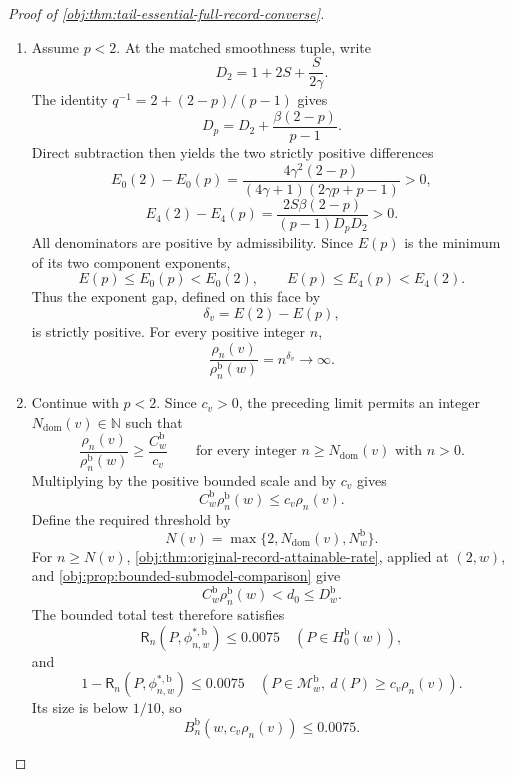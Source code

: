 \begin{proof}[Proof of \cref{obj:thm:tail-essential-full-record-converse}]
\begin{enumerate}
When \(F(p)\ge1\), the paired-tent formula applies throughout:
\[
N=2\left\lceil n^{2q/(2\gamma+q)}\right\rceil
\ge n^{2q/(2\gamma+q)}\longrightarrow\infty,
\qquad
L_{n,v}=N^{\gamma/(p-1)}.
\]
Here \(2q/(2\gamma+q)>0\) and \(\gamma/(p-1)>0\), proving the same
divergence.

\item
Assume \(p<2\). At the matched smoothness tuple, write
\[
D_2=1+2S+\frac{S}{2\gamma}.
\]
The identity \(q^{-1}=2+(2-p)/(p-1)\) gives
\[
D_p=D_2+\frac{\beta(2-p)}{p-1}.
\]
Direct subtraction then yields the two strictly positive differences
\[
E_0(2)-E_0(p)
=
\frac{4\gamma^2(2-p)}
     {(4\gamma+1)(2\gamma p+p-1)}>0,
\]
\[
E_4(2)-E_4(p)
=
\frac{2S\beta(2-p)}
     {(p-1)D_pD_2}>0.
\]
All denominators are positive by admissibility. Since \(E(p)\) is the
minimum of its two component exponents,
\[
E(p)\le E_0(p)<E_0(2),\qquad
E(p)\le E_4(p)<E_4(2).
\]
Thus the exponent gap, defined on this face by
\[
\delta_v=E(2)-E(p),
\]
is strictly positive. For every positive integer \(n\),
\[
\frac{\rho_n(v)}{\rho_n^{\mathrm b}(w)}
=n^{\delta_v}\longrightarrow\infty.
\]

\item
Continue with \(p<2\). Since \(c_v>0\), the preceding limit permits an
integer \(N_{\mathrm{dom}}(v)\in\mathbb N\) such that
\[
\frac{\rho_n(v)}{\rho_n^{\mathrm b}(w)}
\ge\frac{C_w^{\mathrm b}}{c_v}
\qquad
\text{for every integer }n\ge N_{\mathrm{dom}}(v)\text{ with }n>0.
\]
Multiplying by the positive bounded scale and by \(c_v\) gives
\[
C_w^{\mathrm b}\rho_n^{\mathrm b}(w)\le c_v\rho_n(v).
\]
Define the required threshold by
\[
N(v)=\max\{2,N_{\mathrm{dom}}(v),N_w^{\mathrm b}\}.
\]
For \(n\ge N(v)\), \cref{obj:thm:original-record-attainable-rate}, applied
at \((2,w)\), and \cref{obj:prop:bounded-submodel-comparison} give
\[
C_w^{\mathrm b}\rho_n^{\mathrm b}(w)<d_0\le D_w^{\mathrm b}.
\]
The bounded total test therefore satisfies
\[
\mathsf R_n(P,\phi^{*,\mathrm b}_{n,w})\le0.0075
\quad(P\in H_0^{\mathrm b}(w)),
\]
and
\[
1-\mathsf R_n(P,\phi^{*,\mathrm b}_{n,w})\le0.0075
\quad
(P\in\mathcal M_w^{\mathrm b},\ d(P)\ge c_v\rho_n(v)).
\]
Its size is below \(1/10\), so
\[
B_n^{\mathrm b}(w,c_v\rho_n(v))\le0.0075.
\]


\end{enumerate}
\end{proof}
